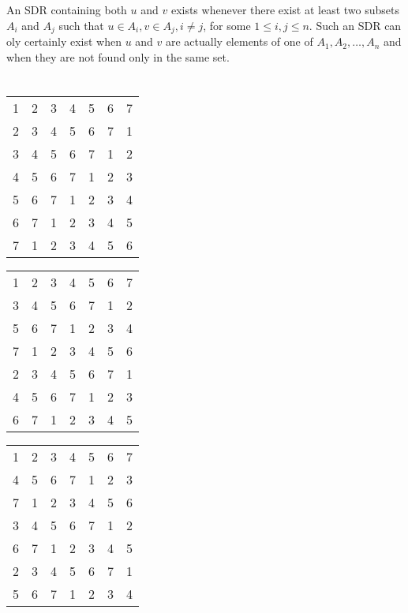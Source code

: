 \documentclass{article}
\begin{document}
\subsection{} %
An SDR containing both $u$ and $v$ exists whenever there exist at least two
subsets $A_i$ and $A_j$ such that $u\in A_i, v\in A_j, i\neq j$, for some
$1\le i,j\le n$. Such an SDR can oly certainly exist when $u$ and $v$ are
actually elements of one of $A_1,A_2,\ldots,A_n$ and when they are not found
only in the same set.
\section{} %
\begin{minipage}{.5\textwidth}
\begin{tabular}{ccccccc}
	1 & 2 & 3 & 4 & 5 & 6 & 7\\
	2 & 3 & 4 & 5 & 6 & 7 & 1\\
	3 & 4 & 5 & 6 & 7 & 1 & 2\\
	4 & 5 & 6 & 7 & 1 & 2 & 3\\
	5 & 6 & 7 & 1 & 2 & 3 & 4\\
	6 & 7 & 1 & 2 & 3 & 4 & 5\\
	7 & 1 & 2 & 3 & 4 & 5 & 6\\
\end{tabular}
\end{minipage}
\begin{minipage}{.5\textwidth}
\begin{tabular}{ccccccc}
	1 & 2 & 3 & 4 & 5 & 6 & 7\\
	3 & 4 & 5 & 6 & 7 & 1 & 2\\
	5 & 6 & 7 & 1 & 2 & 3 & 4\\
	7 & 1 & 2 & 3 & 4 & 5 & 6\\
	2 & 3 & 4 & 5 & 6 & 7 & 1\\
	4 & 5 & 6 & 7 & 1 & 2 & 3\\
	6 & 7 & 1 & 2 & 3 & 4 & 5\\
\end{tabular}
\end{minipage}
\newline
\newline
\newline
\begin{minipage}{.5\textwidth}
\begin{tabular}{ccccccc}
	1 & 2 & 3 & 4 & 5 & 6 & 7\\
	4 & 5 & 6 & 7 & 1 & 2 & 3\\
	7 & 1 & 2 & 3 & 4 & 5 & 6\\
	3 & 4 & 5 & 6 & 7 & 1 & 2\\
	6 & 7 & 1 & 2 & 3 & 4 & 5\\
	2 & 3 & 4 & 5 & 6 & 7 & 1\\
	5 & 6 & 7 & 1 & 2 & 3 & 4\\
\end{tabular}
\end{minipage}
\end{document}
